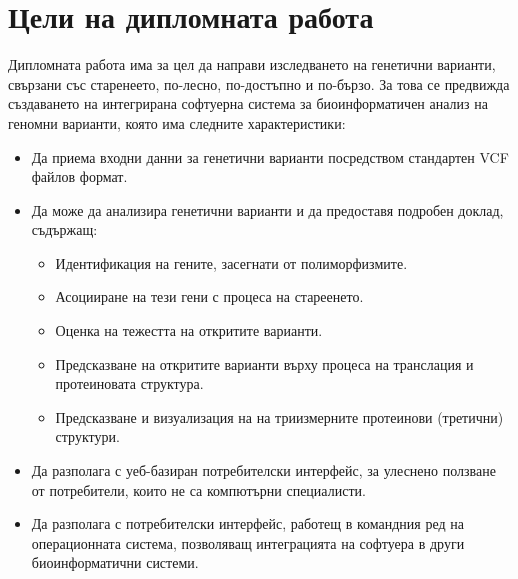 \documentclass[pdftex,cyrillic,14pt,a4page,twoside,openright]{extreport}
\begin{document}
\section{Цели на дипломната работа}
Дипломната работа има за цел да направи изследването на генетични варианти, свързани със старенеето, по-лесно, по-достъпно и по-бързо. За това се предвижда създаването на интегрирана софтуерна система за биоинформатичен анализ на геномни варианти, която има следните характеристики:
\begin{itemize}
  \item Да приема входни данни за генетични варианти посредством стандартен VCF файлов формат.
  \item Да може да анализира генетични варианти и да предоставя подробен доклад, съдържащ:
  	\begin{itemize}
  		\item Идентификация на гените, засегнати от полиморфизмите.
  		\item Асоцииране на тези гени с процеса на стареенето.
  		\item Оценка на тежестта на откритите варианти.
  		\item Предсказване на откритите варианти върху процеса на транслация и протеиновата структура.
  		\item Предсказване и визуализация на на триизмерните протеинови (третични) структури.
 	\end{itemize}
  \item Да разполага с уеб-базиран потребителски интерфейс, за улеснено ползване от
потребители, които не са компютърни специалисти.
  \item Да разполага с потребителски интерфейс, работещ в командния ред на операционната система, позволяващ
интеграцията на софтуера в други биоинформатични системи.
\end{itemize}
\end{document}
